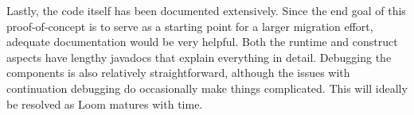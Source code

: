 \documentclass[12pt]{article}
\begin{document}
    Lastly, the code itself has been documented extensively. Since the end goal of this proof-of-concept is
    to serve as a starting point for a larger migration effort, adequate documentation would be very helpful.
    Both the runtime and construct aspects have lengthy javadocs that explain everything in detail. Debugging
    the components is also relatively straightforward, although the issues with continuation debugging do
    occasionally make things complicated. This will ideally be resolved as Loom matures with time.
\end{document}
